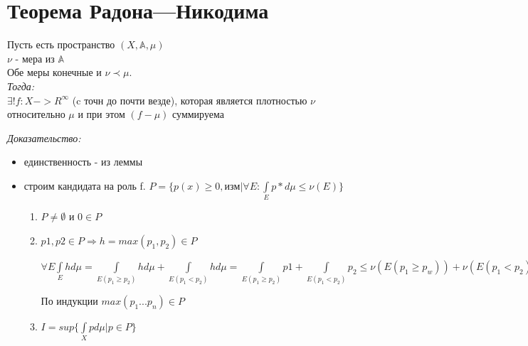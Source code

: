 \documentclass[paper=a4, fontsize=17pt]{article}
\begin{document}
\section{Теорема Радона---Никодима}
	Пусть есть пространство $(X, \mathbb{A}, \mu)$ \\
	$\nu$ - мера из $\mathbb{A}$ \\
	Обе меры конечные и $\nu \prec \mu$. \\
	\emph{Тогда: } \\
		$\exists! f: X->R^{\infty}$ (c точн до почти везде), которая является плотностью $\nu$ относительно $\mu$ и при этом $(f - \mu)$ суммируема

	\emph{Доказательство: }
		\begin{itemize}
			\item единственность - из леммы
			\item строим кандидата на роль f. $P = \{p(x) \geq 0, изм| \forall E :  \int\limits_E p*d\mu \leq \nu(E)\}$
			\begin{enumerate}
				\item
				$P \neq \emptyset$ и $0 \in P$
				\item
				$p1, p2 \in P \Rightarrow h = max(p_1, p_2) \in P$

				$\forall E \int\limits_E h d\mu = \int\limits_{E(p_1 \geq p_2)} h d\mu + \int\limits_{E(p_1 < p_2)} h d\mu =
				\int\limits_{E(p_1 \geq p_2)} p1 + \int\limits_{E(p_1 < p_2)} p_2 \leq \nu(E(p_1 \geq p_w)) + \nu(E(p_1 < p_2)) = \nu E$

				По индукции $max(p_1...p_n)\in P$
				\item
				$I = sup\{\int\limits_X p d\mu | p \in P\}$


\end{enumerate}
\end{itemize}
\end{document}
